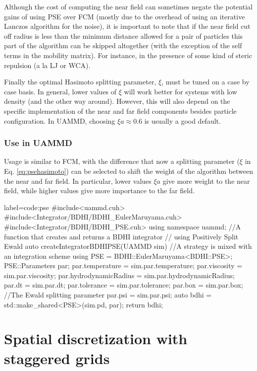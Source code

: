 \documentclass[twoside,openright,titlepage,numbers=noenddot,%
headinclude,footinclude,cleardoublepage=empty,abstract=on,
BCOR=5mm,fontsize=11pt, dvipsnames, paper=b5
]{scrreprt}
\newcommand{\uammd}{\gls{UAMMD}\xspace}
\begin{document}
Although the cost of computing the near field can sometimes negate the potential gains of using \gls{PSE} over \gls{FCM} (mostly due to the overhead of using an iterative Lanczos algorithm for the noise), it is important to note that if the near field cut off radius is less than the minimum distance allowed for a pair of particles this part of the algorithm can be skipped altogether (with the exception of the self terms in the mobility matrix). For instance, in the presence of some kind of steric repulsion (a la \gls{LJ} or WCA).

Finally the optimal Hasimoto splitting parameter, $\xi$, must be tuned on a case by case basis. In general, lower values of $\xi$ will work better for systems with low density (and the other way around). However, this will also depend on the specific implementation of the near and far field components besides particle configuration. In \uammd, choosing $\xi a \approx 0.6$ is usually a good default.

\subsubsection*{Use in UAMMD}

Usage is similar to \gls{FCM}, with the difference that now a splitting parameter ($\xi$ in Eq. \eqref{eq:psehasimoto}) can be selected to shift the weight of the algorithm between the near and far field. In particular, lower values $\xi a$ give more weight to the near field, while higher values give more importance to the far field.

\begin{code2}  {label=code:pse}
#include<uammd.cuh>
#include<Integrator/BDHI/BDHI_EulerMaruyama.cuh>
#include<Integrator/BDHI/BDHI_PSE.cuh>
using namespace uammd;
//A function that creates and returns a BDHI integrator
// using Positively Split Ewald
auto createIntegratorBDHIPSE(UAMMD sim){   
  //A strategy is mixed with an integration scheme
  using PSE = BDHI::EulerMaruyama<BDHI::PSE>;
  PSE::Parameters par;
  par.temperature = sim.par.temperature;
  par.viscosity = sim.par.viscosity;
  par.hydrodynamicRadius = sim.par.hydrodynamicRadius;
  par.dt = sim.par.dt;
  par.tolerance = sim.par.tolerance;
  par.box = sim.par.box;
  //The Ewald splitting parameter
  par.psi = sim.par.psi;
  auto bdhi = std::make_shared<PSE>(sim.pd, par);
  return bdhi;
}
\end{code2}

\newpage
\section{Spatial discretization with staggered grids}\label{sec:staggered}
\end{document}
